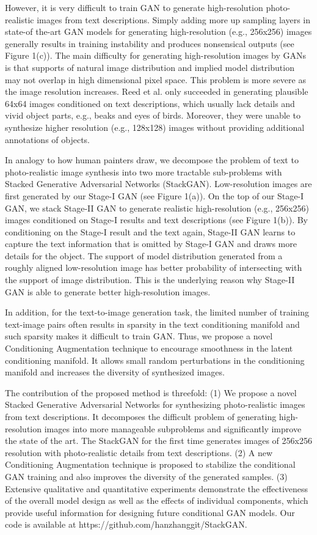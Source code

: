 \documentclass[a4paper,12pt,oneside]{article}
\begin{document}
However, it is very difficult to train GAN to generate high-resolution photo-realistic images from text descriptions. Simply adding more up sampling layers in state-of the-art GAN models for generating high-resolution (e.g., 256x256) images generally results in training instability and produces nonsensical outputs (see Figure 1(c)). The main difficulty for generating high-resolution images by GANs is that supports of natural image distribution and implied model distribution may not overlap in high dimensional pixel space. This problem is more severe as the image resolution increases. Reed et al. only succeeded in generating plausible 64x64 images conditioned on text descriptions, which usually lack details and vivid object parts, e.g., beaks and eyes of birds. Moreover, they were unable to synthesize higher resolution (e.g., 128x128) images without providing additional annotations of objects. 

In analogy to how human painters draw, we decompose the problem of text to photo-realistic image synthesis into two more tractable sub-problems with Stacked Generative Adversarial Networks (StackGAN). Low-resolution images are first generated by our Stage-I GAN (see Figure 1(a)). On the top of our Stage-I GAN, we stack Stage-II GAN to generate realistic high-resolution (e.g., 256x256) images conditioned on Stage-I results and text descriptions (see Figure 1(b)). By conditioning on the Stage-I result and the text again, Stage-II GAN learns to capture the text information that is omitted by Stage-I GAN and draws more details for the object. The support of model distribution generated from a roughly aligned low-resolution image has better probability of intersecting with the support of image distribution. This is the underlying reason why Stage-II GAN is able to generate better high-resolution images. 

In addition, for the text-to-image generation task, the limited number of training text-image pairs often results in sparsity in the text conditioning manifold and such sparsity makes it difficult to train GAN. Thus, we propose a novel Conditioning Augmentation technique to encourage smoothness in the latent conditioning manifold. It allows small random perturbations in the conditioning manifold and increases the diversity of synthesized images. 

The contribution of the proposed method is threefold: (1) We propose a novel Stacked Generative Adversarial Networks for synthesizing photo-realistic images from text descriptions. It decomposes the difficult 
problem of generating high-resolution images into more manageable subproblems and significantly improve the state of the art. The StackGAN for the first time generates images of 256x256 resolution with photo-realistic details from text descriptions. (2) A new Conditioning Augmentation technique is proposed to stabilize the conditional GAN training and also improves the diversity
of the generated samples. (3) Extensive qualitative and quantitative experiments demonstrate the effectiveness of the overall model design as well as the effects of individual components, which provide useful information for designing future conditional GAN models. Our code is available at https://github.com/hanzhanggit/StackGAN. 
\end{document}
